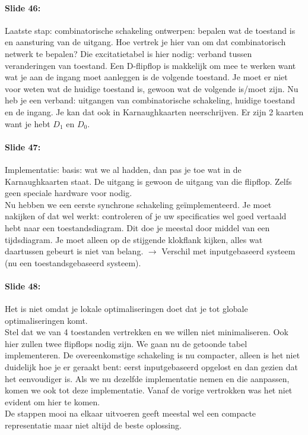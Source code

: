 \documentclass[10pt,a4paper]{book}
\begin{document}
\paragraph{Slide 46:} Laatste stap: combinatorische schakeling ontwerpen: bepalen wat de toestand is en aansturing van de uitgang. Hoe vertrek je hier van om dat combinatorisch netwerk te bepalen? Die excitatietabel is hier nodig: verband tussen veranderingen van toestand. Een D-flipflop is makkelijk om mee te werken want wat je aan de ingang moet aanleggen is de volgende toestand. Je moet er niet voor weten wat de huidige toestand is, gewoon wat de volgende is/moet zijn. Nu heb je een verband: uitgangen van combinatorische schakeling, huidige toestand en de ingang. Je kan dat ook in Karnaughkaarten neerschrijven. Er zijn 2 kaarten want je hebt $D_1$ en $D_0$.

\paragraph{Slide 47:} Implementatie: basis: wat we al hadden, dan pas je toe wat in de Karnaughkaarten staat. De uitgang is gewoon de uitgang van die flipflop. Zelfs geen speciale hardware voor nodig.\\
Nu hebben we een eerste synchrone schakeling ge\"implementeerd. Je moet nakijken of dat wel werkt: controleren of je uw specificaties wel goed vertaald hebt naar een toestandsdiagram. Dit doe je meestal door middel van een tijdsdiagram. Je moet alleen op de stijgende klokflank kijken, alles wat daartussen gebeurt is niet van belang. $\rightarrow$ Verschil met inputgebaseerd systeem (nu een toestandsgebaseerd systeem).

\paragraph{Slide 48:} Het is niet omdat je lokale optimaliseringen doet dat je tot globale optimaliseringen komt.\\
Stel dat we van 4 toestanden vertrekken en we willen niet minimaliseren. Ook hier zullen twee flipflops nodig zijn. We gaan nu de getoonde tabel implementeren. De overeenkomstige schakeling is nu compacter, alleen is het niet duidelijk hoe je er geraakt bent: eerst inputgebaseerd opgelost en dan gezien dat het eenvoudiger is. Als we nu dezelfde implementatie nemen en die aanpassen, komen we ook tot deze implementatie. Vanaf de vorige vertrokken was het niet evident om hier te komen.\\
De stappen mooi na elkaar uitvoeren geeft meestal wel een compacte representatie maar niet altijd de beste oplossing.
\end{document}
